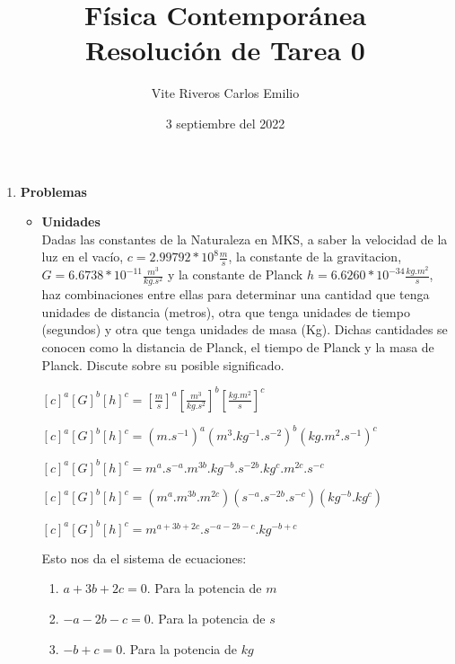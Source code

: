 \documentclass[10pt, a4paper]{article}
\title{Física Contemporánea\\Resolución de Tarea 0}
\author{Vite Riveros Carlos Emilio}
\date{3 septiembre del 2022}
\begin{document}
    \maketitle

    \begin{enumerate}
        \item \textbf{Problemas}
            \begin{itemize}
                \item \textbf{Unidades} \\
                Dadas las constantes de la Naturaleza en MKS, a saber la velocidad de la luz en el vacío, 
                $c = 2.99792 * 10^8 \frac{\si{m}}{\si{s}}$, la constante de la gravitacion,
                $G = 6.6738 * 10^{-11} \frac{\si{m^3}}{\si{kg.s^2}}$ y la constante de Planck $h = 6.6260 * 10^{-34} \frac{\si{kg.m^2}}{\si{s}}$, 
                haz combinaciones entre ellas para determinar una cantidad que tenga unidades
                de distancia (metros), otra que tenga unidades de tiempo (segundos) y otra que
                tenga unidades de masa (Kg). Dichas cantidades se conocen como la distancia
                de Planck, el tiempo de Planck y la masa de Planck. Discute sobre su posible
                significado.
                \begin{center}
            
                    $[c]^{a}[G]^{b}[h]^{c}=[\frac{\si{m}}{\si{s}}]^a[\frac{\si{m^3}}{\si{kg.s^2}}]^b[\frac{\si{kg.m^2}}{\si{s}}]^c$

                    $[c]^{a}[G]^{b}[h]^{c}=(\si{m.s^{-1}})^a(\si{m^3.kg^{-1}.s^{-2}})^b(\si{kg.m^2.s^{-1}})^c$

                    $[c]^{a}[G]^{b}[h]^{c}=\si{m^a.s^{-a}.m^{3b}.kg^{-b}.s^{-2b}.kg^c.m^{2c}.s^{-c}}$

                    $[c]^{a}[G]^{b}[h]^{c}=\si{(m^a.m^{3b}.m^{2c})(s^{-a}.s^{-2b}.s^{-c})(kg^{-b}.kg^c)}$

                    $[c]^{a}[G]^{b}[h]^{c}=\si{m^{a+3b+2c}.s^{-a-2b-c}.kg^{-b+c}}$
                
                \end{center}
                
                Esto nos da el sistema de ecuaciones:

                \begin{enumerate}
                    \item $a+3b+2c=0$. Para la potencia de $\si{m}$
                    \item $-a-2b-c=0$. Para la potencia de $\si{s}$
                    \item $-b+c=0$. Para la potencia de $\si{kg}$
                \end{enumerate}


\end{itemize}
\end{enumerate}
\end{document}
